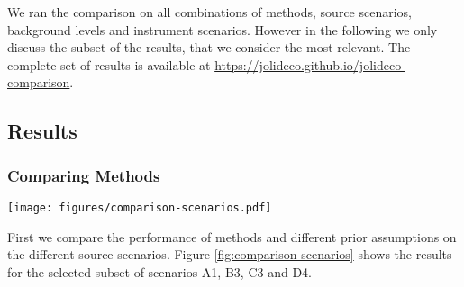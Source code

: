 \documentclass[twocolumn]{aastex631}
\DeclareMathOperator{\arcsinh}{arcsinh}
\newcommand{\jolideco}{\textit{Jolideco}~}
\begin{document}
    We ran the comparison on all combinations of methods, source scenarios, background levels and instrument scenarios. However in the following we only discuss the subset of the results, that we consider the most relevant. The complete set of results is available at \url{https://jolideco.github.io/jolideco-comparison}.

    \subsection{Results}
    \subsubsection{Comparing Methods}
    \begin{figure*}
        \begin{centering}
            \texttt{[image: figures/comparison-scenarios.pdf]}
            \caption{
                Comparison of different deconvolution methods and prior assumptions for different selected source scenarios, as described in Section~\ref{subsec:test-datasets}. The simulation of the data for this figure used a fixed background level of $\lambda_{Bkg} = \qty[mode = math]{0.01}{cts/pix}$, a uniform exposure and a Gaussian PSF of width $\sigma_{PSF} = \qty[mode = math]{2}{pix}$, corresponding to the \enquote{Chandra} instrument scenario. The leftmost column shows the simulated counts data and the second most column from the left the underlying ground truth to compare. The other columns show the reconstructed flux by the different methods and prior assumptions for \jolideco. To enhance weak structures the images use an $\arcsinh$ stretching with a scale parameter of $a=0.02$. The stretching is the same for all images. The methods are described in detail in Section~\ref{subsec:methods}. A more detailed representation of the results is available at \url{https://jolideco.github.io/jolideco-comparison}.
            }
            \label{fig:comparison-scenarios}
        \end{centering}
    \end{figure*}
    First we compare the performance of methods and different prior assumptions on the different source scenarios. Figure \ref{fig:comparison-scenarios} shows the results for the selected subset of scenarios A1, B3, C3 and D4. 
    
\end{document}
